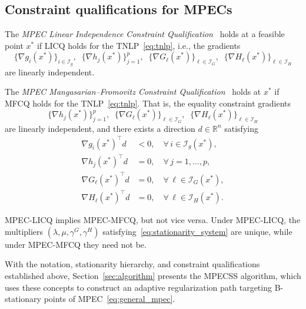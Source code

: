 \subsection{Constraint qualifications for MPECs}
\label{sec:cq}


\begin{definition}\label{def:mpec_licq}
The \emph{MPEC Linear Independence Constraint
Qualification}~\cite{ScheelScholtes2000} holds at a feasible point
$x^*$ if LICQ holds for the TNLP~\eqref{eq:tnlp}, i.e., the gradients
\[
  \bigl\{\nabla g_i(x^*)\bigr\}_{i \in \mathcal{I}_g}, \;\;
  \bigl\{\nabla h_j(x^*)\bigr\}_{j=1}^{p}, \;\;
  \bigl\{\nabla G_\ell(x^*)\bigr\}_{\ell \in \mathcal{I}_G}, \;\;
  \bigl\{\nabla H_\ell(x^*)\bigr\}_{\ell \in \mathcal{I}_H}
\]
are linearly independent.
\end{definition}

\begin{definition}\label{def:mpec_mfcq}
The \emph{MPEC Mangasarian--Fromovitz Constraint
Qualification}~\cite{ScheelScholtes2000} holds at $x^*$ if MFCQ holds
for the TNLP~\eqref{eq:tnlp}. That is, the equality constraint
gradients
\[
  \bigl\{\nabla h_j(x^*)\bigr\}_{j=1}^{p}, \;\;
  \bigl\{\nabla G_\ell(x^*)\bigr\}_{\ell \in \mathcal{I}_G}, \;\;
  \bigl\{\nabla H_\ell(x^*)\bigr\}_{\ell \in \mathcal{I}_H}
\]
are linearly independent, and there exists a direction $d \in
\mathbb{R}^n$ satisfying
\begin{align}
  \nabla g_i(x^*)^\top d &< 0, \quad \forall\, i \in
    \mathcal{I}_g(x^*), \label{eq:mfcq_ineq} \\
  \nabla h_j(x^*)^\top d &= 0, \quad \forall\, j =
    1,\ldots,p, \label{eq:mfcq_eq} \\
  \nabla G_\ell(x^*)^\top d &= 0, \quad \forall\, \ell \in
    \mathcal{I}_G(x^*), \label{eq:mfcq_G} \\
  \nabla H_\ell(x^*)^\top d &= 0, \quad \forall\, \ell \in
    \mathcal{I}_H(x^*). \label{eq:mfcq_H}
\end{align}
\end{definition}

MPEC-LICQ implies MPEC-MFCQ, but not vice
versa. Under MPEC-LICQ, the multipliers
$(\lambda, \mu, \gamma^G, \gamma^H)$ satisfying~\eqref{eq:stationarity_system}
are unique, while under MPEC-MFCQ they need not be.

With the notation, stationarity hierarchy, and constraint qualifications
established above, Section~\ref{sec:algorithm} presents the MPECSS
algorithm, which uses these concepts to construct an adaptive
regularization path targeting B-stationary points
of MPEC~\eqref{eq:general_mpec}.



